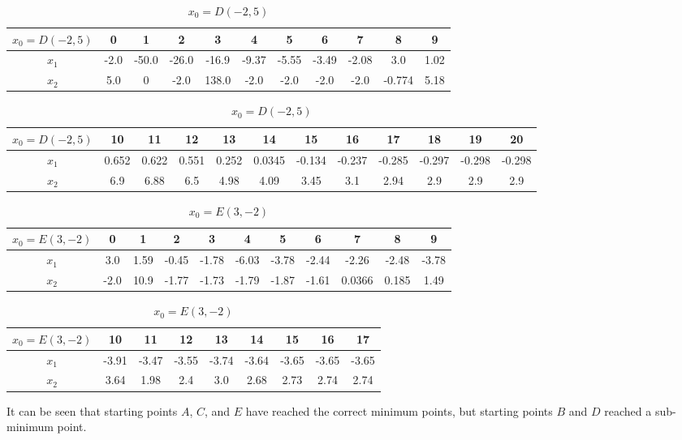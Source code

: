 \begin{table}[H]
\centering
\scriptsize
\begin{tabular}{|c|c|c|c|c|c|c|c|c|c|c|}
\hline
$x_0=D(-2,5)$&0&1&2&3&4&5&6&7&8&9\\
\hline
$x_1$&-2.0 & -50.0 & -26.0 & -16.9 & -9.37 & -5.55 & -3.49 & -2.08 & 3.0 & 1.02  \\
\hline
$x_2$&5.0 & 0 & -2.0 & 138.0 & -2.0 & -2.0 & -2.0 & -2.0 & -0.774 & 5.18 
\\
\hline
\end{tabular}
\begin{tabular}{|c|c|c|c|c|c|c|c|c|c|c|c|}
\hline
$x_0=D(-2,5)$&10&11&12&13&14&15&16&17&18&19&20\\
\hline
$x_1$ &0.652 & 0.622 & 0.551 & 0.252 & 0.0345 & -0.134 & -0.237 & -0.285 & -0.297 & -0.298    & -0.298\\
\hline
$x_2$& 6.9 &6.88 & 6.5 & 4.98 & 4.09 & 3.45 & 3.1 & 2.94 & 2.9 & 2.9     & 2.9
\\
\hline

\end{tabular}
\caption{$x_0=D(-2,5)$}
\end{table}
\begin{table}[H]
\centering
\setlength{\abovecaptionskip}{0cm} 
\setlength{\belowcaptionskip}{-0.5cm}
\scriptsize
\begin{tabular}{|c|c|c|c|c|c|c|c|c|c|c|}
\hline
$x_0=E(3,-2)$&0&1&2&3&4&5&6&7&8&9\\
\hline
$x_1$&3.0 & 1.59 & -0.45 & -1.78 & -6.03 & -3.78 & -2.44 & -2.26 & -2.48 & -3.78  \\
\hline
$x_2$&-2.0 & 10.9 & -1.77 & -1.73 & -1.79 & -1.87 & -1.61 & 0.0366 & 0.185 & 1.49  
\\
\hline
\end{tabular}
\begin{tabular}{|c|c|c|c|c|c|c|c|c|}
\hline
$x_0=E(3,-2)$&10&11&12&13&14&15&16&17\\
\hline
$x_1$ &-3.91 & -3.47 & -3.55 & -3.74 & -3.64 & -3.65 & -3.65 & -3.65\\
\hline
$x_2$&  3.64 & 1.98 & 2.4 & 3.0 & 2.68 & 2.73 & 2.74 & 2.74
\\
\hline

\end{tabular}
\caption{$x_0=E(3,-2)$}
\end{table}
It can be seen that starting points $A$, $C$, and $E$ have reached the correct minimum points, but starting points $B$ and $D$ reached a sub-minimum point.\\
